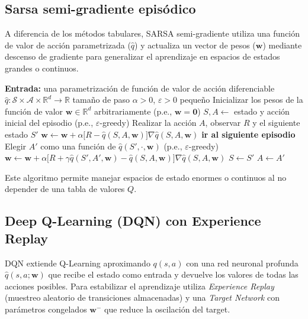 \subsection*{Sarsa semi-gradiente episódico}
A diferencia de los métodos tabulares, SARSA semi-gradiente utiliza una función de valor de acción parametrizada ($\hat{q}$) y actualiza un vector de pesos ($\mathbf{w}$) mediante descenso de gradiente para generalizar el aprendizaje en espacios de estados grandes o continuos.
\begin{algorithm}[!h]
\caption{Sarsa semi-gradiente episódico para estimar $\hat{q} \approx q_*$}\label{algo:semi_gradient_sarsa}
\begin{algorithmic}[1]
\State \textbf{Entrada:} una parametrización de función de valor de acción diferenciable $\hat{q} : \mathcal{S} \times \mathcal{A} \times \mathbb{R}^d \to \mathbb{R}$
\Require tamaño de paso $\alpha > 0$, $\varepsilon > 0$ pequeño
\State Inicializar los pesos de la función de valor $\mathbf{w} \in \mathbb{R}^d$ arbitrariamente (p.e., $\mathbf{w} = \mathbf{0}$)
    \State $S, A \gets$ estado y acción inicial del episodio (p.e., $\varepsilon$-greedy)
        \State Realizar la acción $A$, observar $R$ y el siguiente estado $S'$
            \State $\mathbf{w} \gets \mathbf{w} + \alpha \bigl[ R - \hat{q}(S, A, \mathbf{w}) \bigr] \nabla \hat{q}(S, A, \mathbf{w})$
            \State \textbf{ir al siguiente episodio}
        \EndIf
        \State Elegir $A'$ como una función de $\hat{q}(S', \cdot, \mathbf{w})$ (p.e., $\varepsilon$-greedy)
        \State $\mathbf{w} \gets \mathbf{w} + \alpha \bigl[ R + \gamma \hat{q}(S', A', \mathbf{w}) - \hat{q}(S, A, \mathbf{w}) \bigr] \nabla \hat{q}(S, A, \mathbf{w})$
        \State $S \gets S'$
        \State $A \gets A'$
    \EndWhile
\EndFor
\end{algorithmic}
\end{algorithm}

Este algoritmo permite manejar espacios de estado enormes o continuos al no depender de una tabla de valores $Q$.

\subsection*{Deep Q-Learning (DQN) con Experience Replay}
DQN extiende Q-Learning aproximando $q(s,a)$ con una red neuronal profunda $\hat{q}(s,a;\mathbf{w})$ que recibe el estado como entrada y devuelve los valores de todas las acciones posibles. Para estabilizar el aprendizaje utiliza \textit{Experience Replay} (muestreo aleatorio de transiciones almacenadas) y una \textit{Target Network} con parámetros congelados $\mathbf{w}^-$ que reduce la oscilación del target.

